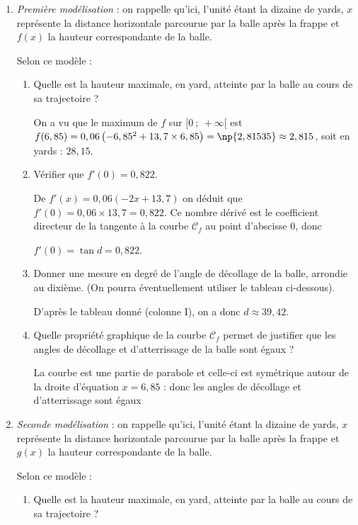 \medskip

\begin{enumerate}
\item \emph{Première modélisation} : on rappelle qu'ici, l'unité étant la dizaine de yards, $x$ représente la distance horizontale parcourue par la balle après la frappe et $f(x)$ la hauteur correspondante de la balle.

Selon ce modèle :
	\begin{enumerate}
		\item Quelle est la hauteur maximale, en yard, atteinte par la balle au cours de sa trajectoire ?
		
On a vu que le maximum de $f$ sur $[0~;~+ \infty[$ est $f(6,85) = 0,06\left(- 6,85^2 + 13,7 \times 6,85\right) = \np{2,81535} \approx 2,815$, soit en yards : $28,15$.

		\item Vérifier que $f'(0) = 0,822$.
		
De $f'(x) = 0,06(- 2x + 13,7)$ on déduit que $f'(0) = 0,06 \times 13,7 = 0,822$. Ce nombre dérivé est le coefficient directeur de la tangente à la courbe $\mathcal{C}_f$ au point d'abscisse $0$, donc 

$f'(0) = \tan d = 0,822$.

		\item Donner une mesure en degré de l'angle de décollage de la balle, arrondie au dixième. (On pourra éventuellement utiliser le tableau ci-dessous).
		
D'après le tableau donné (colonne I), on a donc $d \approx 39,42$.
		\item Quelle propriété graphique de la courbe $\mathcal{C}_f$ permet de justifier que les angles de décollage et d'atterrissage de la balle sont égaux ?
		
	La courbe est une partie de parabole et celle-ci est symétrique autour de la droite d'équation $x = 6,85$ : donc les angles de décollage et d'atterrissage sont égaux
	\end{enumerate}
\item \emph{Seconde modélisation } : on rappelle qu'ici, l'unité étant la dizaine de yards, $x$ représente la distance horizontale parcourue par la balle après la frappe et $g(x)$ la hauteur correspondante de la balle.

Selon ce modèle :

	\begin{enumerate}
		\item Quelle est la hauteur maximale, en yard, atteinte par la balle au cours de sa trajectoire ?


\end{enumerate}
\end{enumerate}
